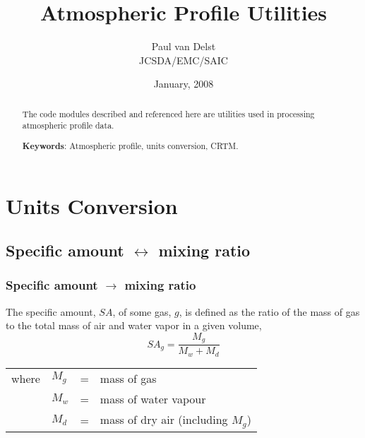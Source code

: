 

%

\newcommand{\D}{\displaystyle}

\title{Atmospheric Profile Utilities}
\author{Paul van Delst\\JCSDA/EMC/SAIC}
\date{January, 2008}




\maketitle

\begin{abstract}
The code modules described and referenced here are utilities used in processing atmospheric profile data.

\textbf{Keywords}: Atmospheric profile, units conversion, CRTM.
\end{abstract}


\section{Units Conversion}
\subsection{Specific amount $\leftrightarrow$ mixing ratio}
\subsubsection{Specific amount $\rightarrow$ mixing ratio}
The specific amount, $SA$, of some gas, $g$, is defined as the ratio of the mass of gas to the total mass of air and water vapor in a given volume,
\begin{equation}
  SA_g = \frac{M_g}{M_w + M_d}
  \label{eqn:SA_defn}
\end{equation}
\begin{tabular}{llcl}
  where & $M_g$ & = & mass of gas\\
        & $M_w$ & = & mass of water vapour\\
        & $M_d$ & = & mass of dry air (including $M_g$)
\end{tabular}

